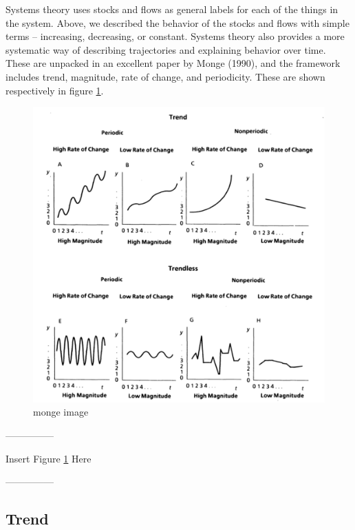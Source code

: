 \documentclass[english,,man]{apa6}
\theoremstyle{definition}
\theoremstyle{definition}
\theoremstyle{definition}
\theoremstyle{remark}
\begin{document}
Systems theory uses stocks and flows as general labels for each of the
things in the system. Above, we described the behavior of the stocks and
flows with simple terms -- increasing, decreasing, or constant. Systems
theory also provides a more systematic way of describing trajectories
and explaining behavior over time. These are unpacked in an excellent
paper by Monge (1990), and the framework includes trend, magnitude, rate
of change, and periodicity. These are shown respectively in figure
\ref{monge}.

\begin{figure}
\centering
\includegraphics{figs/unnamed-chunk-7-1.pdf}
\caption{\label{fig:unnamed-chunk-7}monge image\label{monge}}
\end{figure}

\begin{center}

---------------

Insert Figure \ref{monge} Here

---------------

\end{center}

\hypertarget{trend}{%
\subsection{Trend}\label{trend}}
\end{document}
